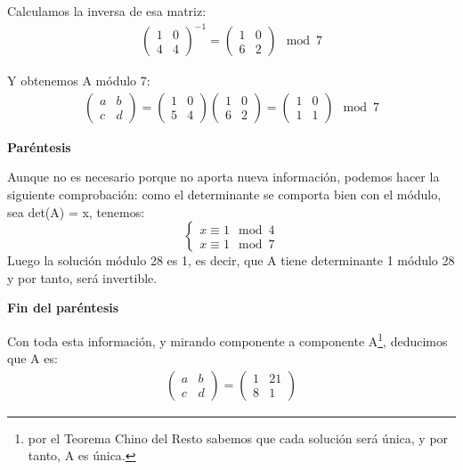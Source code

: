 \begin{problem}[2]
Calculamos la inversa de esa matriz:
\begin{align*}
\left( \begin{array}{cc}
  1 & 0 \\
  4 & 4
  \end{array} \right)^{-1}
  =
  \left( \begin{array}{cc}
  1 & 0 \\
  6 & 2
  \end{array} \right) \mod 7
\end{align*}

Y obtenemos A módulo 7:
\begin{align*}
\left( \begin{array}{cc}
  a & b \\
  c & d
  \end{array} \right)
  =
  \left( \begin{array}{cc}
  1 & 0 \\
  5 & 4
  \end{array} \right)
  \left( \begin{array}{cc}
  1 & 0 \\
  6 & 2
  \end{array} \right) =
  \left( \begin{array}{cc}
  1 & 0 \\
  1 & 1
  \end{array} \right) \mod 7
\end{align*}

{\bf Paréntesis}

Aunque no es necesario porque no aporta nueva información, podemos hacer la siguiente comprobación: como el determinante se comporta bien con el módulo, sea det(A) = x, tenemos:
\[
    \begin{cases}
              x \equiv 1 \mod 4\\
              x \equiv 1 \mod 7
    \end{cases}
\]
Luego la solución módulo 28 es 1, es decir, que A tiene determinante 1 módulo 28 y por tanto, será invertible.

{\bf Fin del paréntesis}

Con toda esta información, y mirando componente a componente A\footnote{por el Teorema Chino del Resto sabemos que cada solución será única, y por tanto, A es única.}, deducimos que A es:
\begin{align*}
\left( \begin{array}{cc}
  a & b \\
  c & d
  \end{array} \right)
  =
\left( \begin{array}{cc}
  1 & 21 \\
  8 & 1
  \end{array} \right)
\end{align*}
\end{problem}

